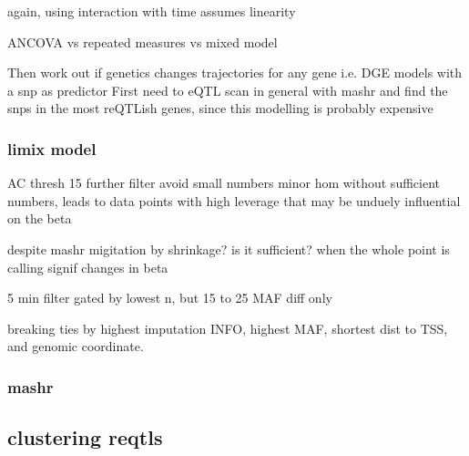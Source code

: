 \begin{outline}
again, using interaction with time assumes linearity



ANCOVA vs repeated measures vs mixed model


Then work out if genetics changes trajectories for any gene i.e. DGE models with a snp as predictor
First need to eQTL scan in general with mashr and find the snps in the most reQTLish genes, since this modelling is probably expensive

\subsubsection{limix model}

AC thresh 15
further filter
avoid small numbers minor hom 
without sufficient numbers, leads to data points with high leverage
that may be unduely influential on the beta

    despite mashr migitation by shrinkage? is it sufficient?
    when the whole point is calling signif changes in beta

5 min filter
    gated by lowest n, but 15 to 25 MAF diff only

breaking ties by highest imputation INFO, highest \gls{MAF}, shortest dist to \gls{TSS}, and genomic coordinate.

\subsubsection{mashr}

\subsection{clustering reqtls}



\end{outline}
